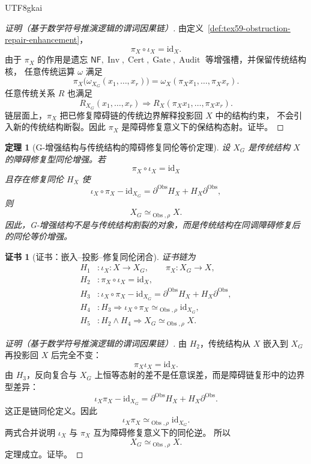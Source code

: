 \documentclass[12pt]{article}
\newtheorem{theorem}{定理}[section]
\newtheorem{Certificate}{证书}[section]
\newcommand{\NF}{\mathsf{NF}}
\newcommand{\id}{\mathrm{id}}
\DeclareMathOperator{\Cert}{Cert}
\DeclareMathOperator{\Audit}{Audit}
\DeclareMathOperator{\Gate}{Gate}
\DeclareMathOperator{\Obs}{Obs}
\DeclareMathOperator{\Inv}{Inv}
\begin{document}
\begin{CJK*}{UTF8}{gkai}
\begin{proof}[证明（基于数学符号推演逻辑的谓词因果链）]
由定义~\ref{def:tex59-obstruction-repair-enhancement}，
\[
  \pi_X\circ\iota_X=\id_X.
\]
由于 \(\pi_X\) 的作用是遗忘 \(\NF,\Inv,\Cert,\Gate,\Audit\) 等增强槽，并保留传统结构核，
任意传统运算 \(\omega\) 满足
\[
  \pi_X\bigl(\omega_{X_G}(x_1,\ldots,x_r)\bigr)
  =
  \omega_X(\pi_Xx_1,\ldots,\pi_Xx_r).
\]
任意传统关系 \(R\) 也满足
\[
  R_{X_G}(x_1,\ldots,x_r)
  \Rightarrow
  R_X(\pi_Xx_1,\ldots,\pi_Xx_r).
\]
链层面上，\(\pi_X\) 把已修复障碍链的传统边界解释投影回 \(X\) 中的结构约束，
不会引入新的传统结构断裂。因此 \(\pi_X\) 是障碍修复意义下的保结构态射。证毕。
\end{proof}

\begin{theorem}[G-增强结构与传统结构的障碍修复同伦等价定理]
\label{thm:tex59-g-enhancement-obstruction-homotopy-equivalence}
设 \(X_G\) 是传统结构 \(X\) 的障碍修复型同伦增强。若
\[
  \pi_X\circ\iota_X=\id_X
\]
且存在修复同伦 \(H_X\) 使
\[
  \iota_X\circ\pi_X-\id_{X_G}
  =
  \partial^{\Obs}H_X+H_X\partial^{\Obs},
\]
则
\[
  X_G\simeq_{\Obs,\rho}X.
\]
因此，G-增强结构不是与传统结构割裂的对象，而是传统结构在同调障碍修复后的同伦等价增强。
\end{theorem}

\begin{Certificate}[证书：嵌入--投影--修复同伦闭合]
\label{cert:tex59-g-enhancement-obstruction-homotopy-equivalence}
证书链为
\[
\begin{aligned}
  H_1 &: \iota_X:X\to X_G,\qquad \pi_X:X_G\to X,\\
  H_2 &: \pi_X\circ\iota_X=\id_X,\\
  H_3 &: \iota_X\circ\pi_X-\id_{X_G}
         =
         \partial^{\Obs}H_X+H_X\partial^{\Obs},\\
  H_4 &: H_3\Rightarrow
         \iota_X\circ\pi_X\simeq_{\Obs,\rho}\id_{X_G},\\
  H_5 &: H_2\wedge H_4
         \Rightarrow
         X_G\simeq_{\Obs,\rho}X.
\end{aligned}
\]
\end{Certificate}

\begin{proof}[证明（基于数学符号推演逻辑的谓词因果链）]
由 \(H_2\)，传统结构从 \(X\) 嵌入到 \(X_G\) 再投影回 \(X\) 后完全不变：
\[
  \pi_X\iota_X=\id_X.
\]
由 \(H_3\)，反向复合与 \(X_G\) 上恒等态射的差不是任意误差，而是障碍链复形中的边界型差异：
\[
  \iota_X\pi_X-\id_{X_G}
  =
  \partial^{\Obs}H_X+H_X\partial^{\Obs}.
\]
这正是链同伦定义。因此
\[
  \iota_X\pi_X\simeq_{\Obs,\rho}\id_{X_G}.
\]
两式合并说明 \(\iota_X\) 与 \(\pi_X\) 互为障碍修复意义下的同伦逆。
所以
\[
  X_G\simeq_{\Obs,\rho}X.
\]
定理成立。证毕。
\end{proof}


\end{CJK*}
\end{document}
